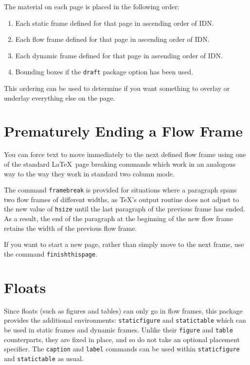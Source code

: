 \documentclass[a4paper]{report}
\newcommand{\env}[1]{\texttt{#1}}
\newcommand{\cmdname}[1]{\texttt{\symbol{92}#1}}
\begin{document}
The material on each page is placed in the following order:
\begin{enumerate}
\item Each static frame defined for that page in ascending
order of IDN.

\item Each flow frame defined for that page in ascending
order of IDN.

\item Each dynamic frame defined for that page in ascending
order of IDN.

\item {Bounding boxes} if the \texttt{draft}
package option has been used.
\end{enumerate}

This ordering can be used to determine if you want something
to overlay or underlay everything else on the page.

\section*{Prematurely Ending a Flow Frame}

You can force text to move immediately to the next defined
flow frame using one of the standard \LaTeX\ page breaking commands
which  work in an analogous way to the way they
work in standard two column mode.

The command \cmdname{framebreak} is provided for situations
where a paragraph spans two flow frames
of different widths, as \TeX's output routine does not
adjust to the new value of \cmdname{hsize} until the last
paragraph of the previous frame has ended. As a
result, the end of the paragraph at the beginning of the new
flow frame retains the width of the previous flow frame.

If you want to start a new page, rather than simply move to the
next frame, use the command\newline
\cmdname{finishthispage}.

\section*{Floats}

Since floats (such as figures and tables) can only go in
{flow frames}, this package provides
the additional environments:
\env{staticfigure} and
\env{statictable} which can be used in static frames
and dynamic frames. Unlike their \env{figure} and
\env{table} counterparts, they are fixed in place, and
so do not take an optional placement specifier. The
\cmdname{caption} and \cmdname{label} commands can
be used within \env{staticfigure} and \env{statictable} as
usual.
\end{document}
